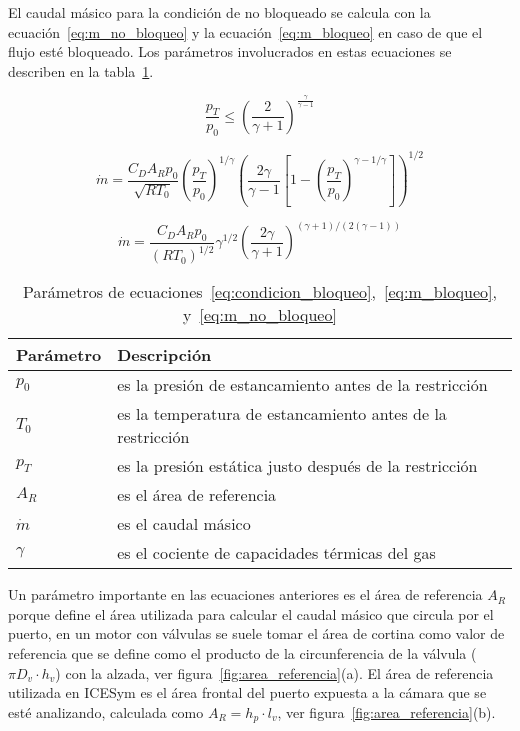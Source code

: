 El caudal másico para la condición de no bloqueado se calcula con la
ecuación~\ref{eq:m_no_bloqueo} y la ecuación~\ref{eq:m_bloqueo} en caso de que
el flujo esté bloqueado.
%
Los parámetros involucrados en estas ecuaciones se describen en la
tabla~\ref{tab:parametros_cd}.

\begin{equation}\label{eq:condicion_bloqueo}
  \frac{p_{T}}{p_{0}} \le {\left(\frac{2}{\gamma+1}\right)}^{\frac{\gamma}{\gamma - 1}}
\end{equation}

\begin{equation}
    \label{eq:m_no_bloqueo}
    \dot{m} = \frac{C_D A_R p_0}{\sqrt{R T_0}}
            {\left(\frac{p_T}{p_0} \right)}^{1/\gamma}
            {\left( \frac{2\gamma}{\gamma-1} \left[1- {\left(\frac{p_T}{p_0}\right)}^{{\gamma-1}/\gamma} \right] \right)}^{1/2}
\end{equation}

\begin{equation}\label{eq:m_bloqueo}
  \dot{m}=  \frac {C_D A_R p_0} {{(R T_0)}^{1/2}}
            \gamma^{1/2}
            {\left( \frac{2\gamma}{\gamma+1} \right)}^{(\gamma+1)/(2(\gamma-1))}
\end{equation}


\begin{table}
  \centering
  \begin{tabular}{ll}\toprule
    Parámetro & Descripción \\ \midrule
    $p_0$ & es la presión de estancamiento antes de la restricción \\
    $T_0$ & es la temperatura de estancamiento antes de la restricción \\
    $p_T$ & es la presión estática justo después de la restricción \\
    $A_R$ & es el área de referencia \\
    $\dot{m}$ & es el caudal másico \\
    $\gamma$ & es el cociente de capacidades térmicas del gas \\ \bottomrule
  \end{tabular}
  \caption{Parámetros de
ecuaciones~\ref{eq:condicion_bloqueo},~\ref{eq:m_bloqueo},
y~\ref{eq:m_no_bloqueo}}\label{tab:parametros_cd}
\end{table}


Un parámetro importante en las ecuaciones anteriores es el área de referencia
$A_{R}$ porque define el área utilizada para calcular el caudal másico que
circula por el puerto, en un motor con válvulas se suele tomar el área de
cortina como valor de referencia que se define como el producto de la
circunferencia de la válvula ($\pi D_{v} \cdot h_{v}$) con la alzada, ver
figura~\ref{fig:area_referencia}(a).
%
El área de referencia utilizada en ICESym es el área frontal del puerto expuesta
a la cámara que se esté analizando, calculada como $A_{R} = h_{p} \cdot l_{v}$, ver
figura~\ref{fig:area_referencia}(b).

